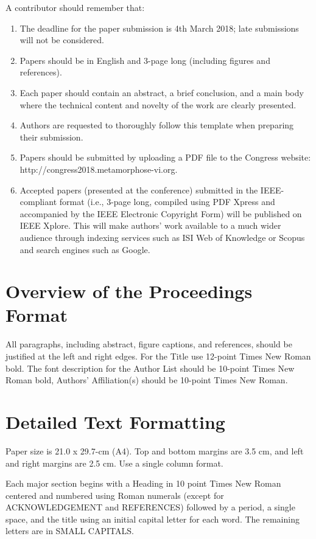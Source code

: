 \documentclass[10pt,a4paper]{article}
\begin{document}
A contributor should remember that:
\begin{enumerate} \setlength{\itemsep}{-1ex}
\item	The deadline for the paper submission is 4th March 2018; late submissions will not be considered.
\item	Papers should be in English and 3-page long (including figures and references).
\item	Each paper should contain an abstract, a brief conclusion, and a main body where the technical content and novelty of the work are clearly presented.
\item	Authors are requested to thoroughly follow this template when preparing their submission.
\item	Papers should be submitted by uploading a PDF file to the Congress website: \\ http://congress2018.metamorphose-vi.org.
\item	Accepted papers (presented at the conference) submitted in the IEEE-compliant format (i.e., 3-page long, compiled using PDF Xpress and accompanied by the IEEE Electronic Copyright Form) will be published on IEEE Xplore. This will make authors' work available to a much wider audience through indexing services such as ISI Web of Knowledge or Scopus and search engines such as Google. \end{enumerate}

\section{Overview of the Proceedings Format}

All paragraphs, including abstract, figure captions, and references, should be justified at the left and right edges. For the Title use 12-point Times New Roman bold. The font description for the Author List should be 10-point Times New Roman bold, Authors' Affiliation(s) should be 10-point Times New Roman.

\section{Detailed Text Formatting}

Paper size is 21.0 x 29.7-cm (A4). Top and bottom margins are 3.5 cm, and left and right margins are 2.5 cm. Use a single column format.

Each major section begins with a Heading in 10 point Times New Roman centered and numbered using Roman numerals (except for ACKNOWLEDGEMENT and REFERENCES) followed by a period, a single space, and the title using an initial capital letter for each word. The remaining letters are in SMALL CAPITALS.
\end{document}
